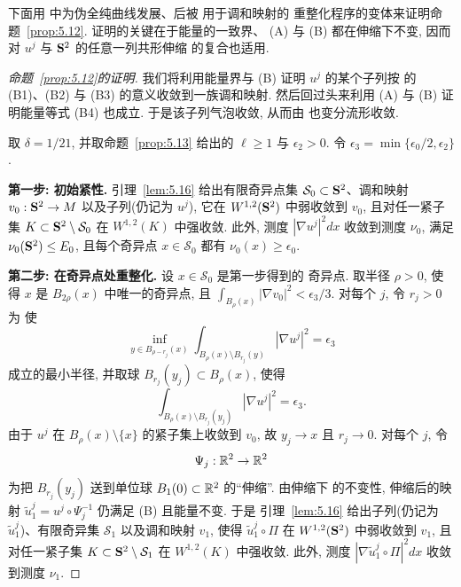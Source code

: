 下面用 \cite{PkW} 中为伪全纯曲线发展、后被 \cite{Pk} 用于调和映射的
重整化程序的变体来证明命题~\ref{prop:5.12}. 证明的关键在于能量的一致界、
(A) 与 (B) 都在伸缩下不变, 因而对 $u^j$ 与 $\mathbf{S}^2$ 的任意一列共形伸缩
的复合也适用.

\begin{proof}[命题~\ref{prop:5.12}的证明]
我们将利用能量界与 (B) 证明 $u^j$ 的某个子列按 的 (B1)、(B2) 与
(B3) 的意义收敛到一族调和映射. 然后回过头来利用 (A) 与 (B) 证明能量等式
(B4) 也成立. 于是该子列气泡收敛, 从而由 也变分流形收敛.

取 $\delta=1/21$, 并取命题~\ref{prop:5.13} 给出的 $\ell\geq 1$ 与
$\epsilon_2>0$. 令 $\epsilon_3=\min\{\epsilon_0/2,\epsilon_2\}$.

\textbf{第一步: 初始紧性.} 引理~\ref{lem:5.16} 给出有限奇异点集
$\mathcal{S}_0\subset\mathbf{S}^2$、调和映射 $v_0:\mathbf{S}^2\to M$ 以及子列(仍记为
$u^j$), 它在 $W^{1,2}(\mathbf{S}^2)$ 中弱收敛到 $v_0$, 且对任一紧子集
$K\subset\mathbf{S}^2\setminus\mathcal{S}_0$ 在 $W^{1,2}(K)$ 中强收敛. 此外,
测度 $|\nabla u^j|^2dx$ 收敛到测度 $\nu_0$, 满足
$\nu_0(\mathbf{S}^2)\leq E_0$, 且每个奇异点 $x\in\mathcal{S}_0$ 都有
$\nu_0(x)\geq\epsilon_0$.

\textbf{第二步: 在奇异点处重整化.} 设 $x\in\mathcal{S}_0$ 是第一步得到的
奇异点. 取半径 $\rho>0$, 使得 $x$ 是 $B_{2\rho}(x)$ 中唯一的奇异点, 且
$\int_{B_\rho(x)}|\nabla v_0|^2<\epsilon_3/3$. 对每个 $j$, 令 $r_j>0$ 为
使
\begin{equation}
\inf_{y\in B_{\rho-r_j}(x)}\int_{B_\rho(x)\setminus B_{r_j}(y)}
|\nabla u^j|^2=\epsilon_3
\label{eq:5.74}
\end{equation}
成立的最小半径, 并取球 $B_{r_j}(y_j)\subset B_\rho(x)$, 使得
\begin{equation}
\int_{B_\rho(x)\setminus B_{r_j}(y_j)}|\nabla u^j|^2=\epsilon_3.
\label{eq:5.75}
\end{equation}
由于 $u^j$ 在 $B_\rho(x)\setminus\{x\}$ 的紧子集上收敛到 $v_0$, 故
$y_j\to x$ 且 $r_j\to 0$. 对每个 $j$, 令
\begin{equation}
\Psi_j:\mathbb{R}^2\to\mathbb{R}^2
\label{eq:5.76}
\end{equation}
为把 $B_{r_j}(y_j)$ 送到单位球 $B_1(0)\subset\mathbb{R}^2$ 的``伸缩''. 由伸缩下
的不变性, 伸缩后的映射
$\tilde{u}_1^j=u^j\circ\Psi_j^{-1}$ 仍满足 (B) 且能量不变. 于是
引理~\ref{lem:5.16} 给出子列(仍记为 $\tilde{u}_1^j$)、有限奇异集
$\mathcal{S}_1$ 以及调和映射 $v_1$, 使得 $\tilde{u}_1^j\circ\Pi$ 在
$W^{1,2}(\mathbf{S}^2)$ 中弱收敛到 $v_1$, 且对任一紧子集
$K\subset\mathbf{S}^2\setminus\mathcal{S}_1$ 在 $W^{1,2}(K)$ 中强收敛. 此外,
测度 $|\nabla\tilde{u}_1^j\circ\Pi|^2dx$ 收敛到测度 $\nu_1$.


\end{proof}
